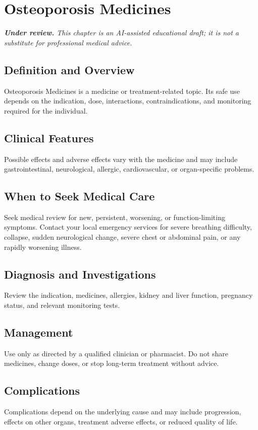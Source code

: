 \chapter{Osteoporosis Medicines}

\medskip
\noindent\textit{\textbf{Under review.} This chapter is an AI-assisted educational draft; it is not a substitute for professional medical advice.}

\section*{Definition and Overview}
Osteoporosis Medicines is a medicine or treatment-related topic. Its safe use depends on the indication, dose, interactions, contraindications, and monitoring required for the individual.

\section*{Clinical Features}
Possible effects and adverse effects vary with the medicine and may include gastrointestinal, neurological, allergic, cardiovascular, or organ-specific problems.

\section*{When to Seek Medical Care}
Seek medical review for new, persistent, worsening, or function-limiting symptoms. Contact your local emergency services for severe breathing difficulty, collapse, sudden neurological change, severe chest or abdominal pain, or any rapidly worsening illness.

\section*{Diagnosis and Investigations}
Review the indication, medicines, allergies, kidney and liver function, pregnancy status, and relevant monitoring tests.

\section*{Management}
Use only as directed by a qualified clinician or pharmacist. Do not share medicines, change doses, or stop long-term treatment without advice.

\section*{Complications}
Complications depend on the underlying cause and may include progression, effects on other organs, treatment adverse effects, or reduced quality of life.

